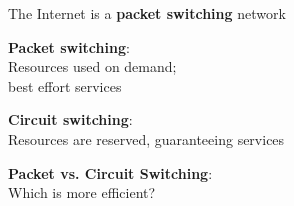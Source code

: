 \begin{frame}[plain]\begin{center}
\end{center}\end{frame}

\begin{frame}\begin{center}\large
The Internet is a \textbf{packet switching} network
\end{center}\end{frame}

\begin{frame}\begin{center}\large
\textbf{Packet switching}:\\\large Resources used on demand;\\best effort services
\end{center}\end{frame}

\begin{frame}\begin{center}\large
\textbf{Circuit switching}:\\\large Resources are reserved, guaranteeing services
\end{center}\end{frame}

\begin{frame}\begin{center}\large
\textbf{Packet vs. Circuit Switching}:\\\large Which is more efficient?
\end{center}\end{frame}


